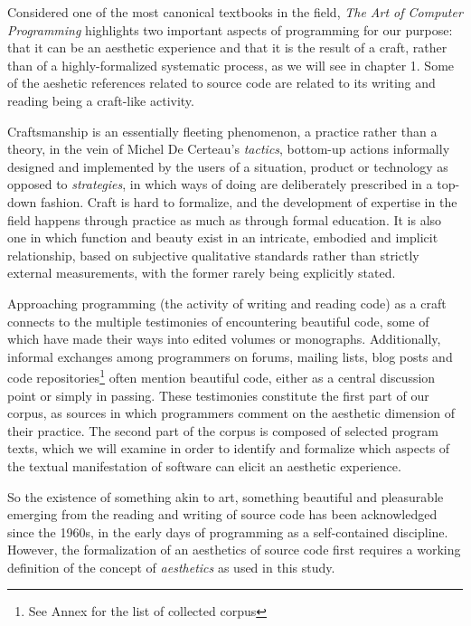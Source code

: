 Considered one of the most canonical textbooks in the field, \emph{The Art of Computer Programming} highlights two important aspects of programming for our purpose: that it can be an aesthetic experience and that it is the result of a craft, rather than of a highly-formalized systematic process, as we will see in chapter 1. Some of the aeshetic references related to source code are related to its writing and reading being a craft-like activity\cite{dijkstra_craftsman_1982}.

Craftsmanship is an essentially fleeting phenomenon, a practice rather than a theory, in the vein of Michel De Certeau's \textit{tactics}, bottom-up actions informally designed and implemented by the users of a situation, product or technology as opposed to \textit{strategies}\cite{certeau_invention_1990}, in which ways of doing are deliberately prescribed in a top-down fashion. Craft is hard to formalize, and the development of expertise in the field happens through practice as much as through formal education\cite{sennett_craftsman_2009}. It is also one in which function and beauty exist in an intricate, embodied and implicit relationship, based on subjective qualitative standards rather than strictly external measurements, with the former rarely being explicitly stated\cite{pye_nature_2008}.

Approaching programming (the activity of writing and reading code) as a craft\cite{levy_programmation_1992} connects to the multiple testimonies of encountering beautiful code, some of which have made their ways into edited volumes or monographs\cite{oram_beautiful_2007,chandra_geek_2014,gabriel_patterns_1998}. Additionally, informal exchanges among programmers on forums, mailing lists, blog posts and code repositories\footnote{See Annex for the list of collected corpus} often mention beautiful code, either as a central discussion point or simply in passing. These testimonies constitute the first part of our corpus, as sources in which programmers comment on the aesthetic dimension of their practice. The second part of the corpus is composed of selected program texts, which we will examine in order to identify and formalize which aspects of the textual manifestation of software can elicit an aesthetic experience.

So the existence of something akin to art, something beautiful and pleasurable emerging from the reading and writing of source code has been acknowledged since the 1960s, in the early days of programming as a self-contained discipline. However, the formalization of an aesthetics of source code first requires a working definition of the concept of \emph{aesthetics} as used in this study.

